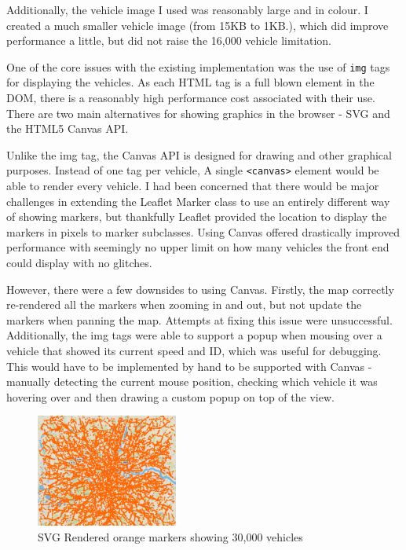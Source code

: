 \documentclass[ %
                    author={Alexander Hill},
                supervisor={Dr. Benjamin Sach},
                    degree={MEng},
                     title={MARMOSET},
                  subtitle={Multi-Agent Route Management using Online Simulation for Efficient Transportation},
                      type={research},
                      year={2016} ]{dissertation}
\begin{document}
Additionally, the vehicle image I used was reasonably large and in colour. I
created a much smaller vehicle image (from 15KB to 1KB.), which did improve
performance a little, but did not raise the 16,000 vehicle limitation.

One of the core issues with the existing implementation was the use of
\texttt{img} tags for displaying the vehicles. As each HTML tag is a full blown
element in the DOM, there is a reasonably high performance cost associated with
their use. There are two main alternatives for showing graphics in the browser -
SVG and the HTML5 Canvas API.

Unlike the img tag, the Canvas API is designed for drawing and other graphical
purposes. Instead of one tag per vehicle, A single \texttt{<canvas>} element
would be able to render every vehicle. I had been concerned that there would be
major challenges in extending the Leaflet Marker class to use an entirely
different way of showing markers, but thankfully Leaflet provided the location
to display the markers in pixels to marker subclasses. Using Canvas offered
drastically improved performance with seemingly no upper limit on how many
vehicles the front end could display with no glitches.

However, there were a few downsides to using Canvas. Firstly, the map correctly
re-rendered all the markers when zooming in and out, but not update the markers
when panning the map. Attempts at fixing this issue were unsuccessful.
Additionally, the img tags were able to support a popup when mousing over a
vehicle that showed its current speed and ID, which was useful for debugging.
This would have to be implemented by hand to be supported with Canvas - manually
detecting the current mouse position, checking which vehicle it was hovering
over and then drawing a custom popup on top of the view.

\begin{figure}
    \centering
    \includegraphics[height=10em]{orange-markers}
    \caption{SVG Rendered orange markers showing 30,000 vehicles}\label{fig:orange-markers}
\end{figure}
\end{document}
